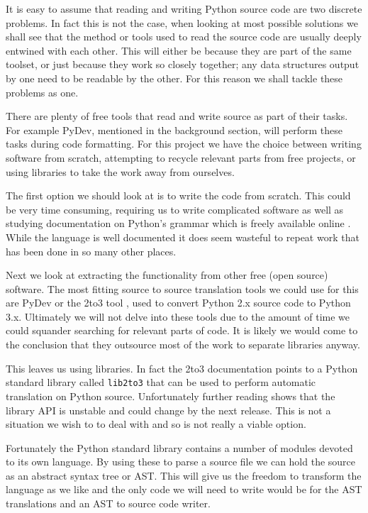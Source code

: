 \documentclass{report}
\begin{document}
It is easy to assume that reading and writing Python source code are two discrete problems. In fact this is not the case,
when looking at most possible solutions we shall see that the method or tools used to read the source code are usually deeply
entwined with each other. This will either be because they are part of the same toolset, or just because they work so closely together;
any data structures output by one need to be readable by the other. For this reason we shall tackle these problems as one.

There are plenty of free tools that read and write source as part of their tasks. For example PyDev, mentioned in the background section, will
perform these tasks during code formatting. For this project we have the choice between writing software from scratch, attempting
to recycle relevant parts from free projects, or using libraries to take the work away from ourselves.

The first option we should look at is to write the code from scratch. This could be very time consuming, requiring
us to write complicated software as well as studying documentation on Python's grammar which is freely available online \cite{pygrammar}.
While the language is well documented it does seem wasteful to repeat work that has been done in so many other places.

Next we look at extracting the functionality from other free (open source) software. The most fitting source to source translation tools
we could use for this are PyDev or the 2to3 tool \cite{2to3}, used to convert Python 2.x source code to Python 3.x. Ultimately we will not
delve into these tools due to the amount of time we could squander searching for relevant parts of code. It is likely we
would come to the conclusion that they outsource most of the work to separate libraries anyway.

This leaves us using libraries. In fact the 2to3 documentation points to a Python standard library called \texttt{lib2to3} that can be used to
perform automatic translation on Python source. Unfortunately further reading shows that the library API is unstable and could change by
the next release. This is not a situation we wish to to deal with and so is not really a viable option.

Fortunately the Python standard library contains a number of modules devoted to its own language. By using these to parse a source file
we can hold the source as an abstract syntax tree or AST. This will give us the freedom to transform the language as we like and the only code we
will need to write would be for the AST translations and an AST to source code writer.
\end{document}
